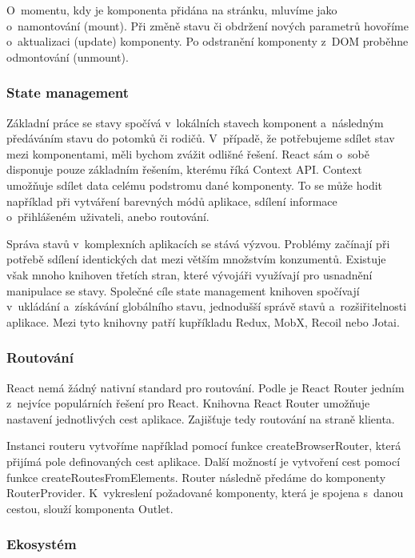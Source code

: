 O~momentu, kdy je komponenta přidána na stránku, mluvíme jako o~namontování (mount). Při změně stavu či obdržení nových parametrů hovoříme o~aktualizaci (update) komponenty. 
Po odstranění komponenty z~DOM proběhne odmontování (unmount).\cite{reactlifecycle, react}

\subsubsection{State management}

Základní práce se stavy spočívá v~lokálních stavech komponent a~následným předáváním stavu do potomků či rodičů. 
V~případě, že potřebujeme sdílet stav mezi komponentami, měli bychom zvážit odlišné řešení. React sám o~sobě disponuje pouze základním řešením, kterému říká Context API. 
Context umožňuje sdílet data celému podstromu dané komponenty. 
To se může hodit například při vytváření barevných módů aplikace, sdílení informace o~přihlášeném uživateli, anebo routování.\cite{react}

Správa stavů v~komplexních aplikacích se stává výzvou. Problémy začínají při potřebě sdílení identických dat mezi větším množstvím konzumentů. 
Existuje však mnoho knihoven třetích stran, které vývojáři využívají pro usnadnění manipulace se stavy. 
Společné cíle state management knihoven spočívají v~ukládání a~získávání globálního stavu, jednodušší správě stavů a~rozšiřitelnosti aplikace.
Mezi tyto knihovny patří kupříkladu Redux, MobX, Recoil nebo Jotai.\cite{statemanagementreact,reactstatemanagement}

\subsubsection{Routování}

React nemá žádný nativní standard pro routování. Podle \cite{reactbanks} je React Router jedním z~nejvíce populárních řešení pro React. 
Knihovna React Router umožňuje nastavení jednotlivých cest aplikace. Zajišťuje tedy routování na straně klienta.

Instanci routeru vytvoříme například pomocí funkce createBrowserRouter, která přijímá pole definovaných cest aplikace. 
Další možností je vytvoření cest pomocí funkce createRoutesFromElements. Router následně předáme do komponenty RouterProvider. 
K~vykreslení požadované komponenty, která je spojena s~danou cestou, slouží komponenta Outlet.\cite{reactbanks,reactrouter}

\subsubsection{Ekosystém}


